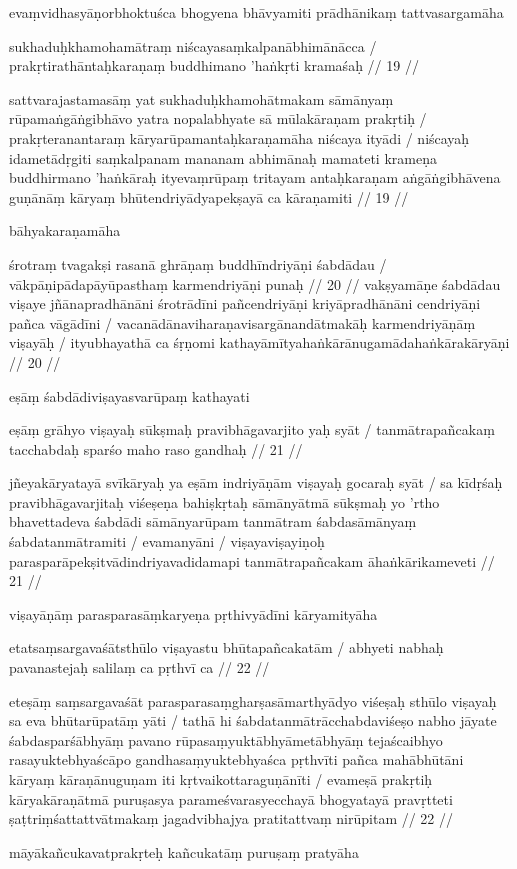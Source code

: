evaṃvidhasyāṇorbhoktuśca bhogyena bhāvyamiti prādhānikaṃ tattvasargamāha

sukhaduḥkhamohamātraṃ niścayasaṃkalpanābhimānācca  /
prakṛtirathāntaḥkaraṇaṃ buddhimano 'haṅkṛti kramaśaḥ  // 19  //

sattvarajastamasāṃ yat sukhaduḥkhamohātmakam sāmānyaṃ rūpamaṅgāṅgibhāvo yatra nopalabhyate sā mūlakāraṇam prakṛtiḥ  / prakṛteranantaraṃ kāryarūpamantaḥkaraṇamāha niścaya ityādi  / niścayaḥ idametādṛgiti saṃkalpanam mananam abhimānaḥ mamateti krameṇa buddhirmano 'haṅkāraḥ ityevaṃrūpaṃ tritayam antaḥkaraṇam aṅgāṅgibhāvena guṇānāṃ kāryaṃ bhūtendriyādyapekṣayā ca kāraṇamiti  // 19  //

bāhyakaraṇamāha

śrotraṃ tvagakṣi rasanā ghrāṇaṃ buddhīndriyāṇi śabdādau  /
vākpāṇipādapāyūpasthaṃ karmendriyāṇi punaḥ  // 20  //
vakṣyamāṇe śabdādau viṣaye jñānapradhānāni śrotrādīni pañcendriyāṇi kriyāpradhānāni cendriyāṇi pañca vāgādīni  / vacanādānaviharaṇavisargānandātmakāḥ karmendriyāṇāṃ viṣayāḥ  / ityubhayathā ca śṛṇomi kathayāmītyahaṅkārānugamādahaṅkārakāryāṇi  // 20  //

eṣāṃ śabdādiviṣayasvarūpaṃ kathayati

eṣāṃ grāhyo viṣayaḥ sūkṣmaḥ pravibhāgavarjito yaḥ syāt  /
tanmātrapañcakaṃ tacchabdaḥ sparśo maho raso gandhaḥ  // 21  //

jñeyakāryatayā svīkāryaḥ ya eṣām indriyāṇām viṣayaḥ gocaraḥ syāt  / sa kīdṛśaḥ pravibhāgavarjitaḥ viśeṣeṇa bahiṣkṛtaḥ sāmānyātmā sūkṣmaḥ yo 'rtho bhavettadeva śabdādi sāmānyarūpam tanmātram śabdasāmānyaṃ śabdatanmātramiti  / evamanyāni  / viṣayaviṣayiṇoḥ parasparāpekṣitvādindriyavadidamapi tanmātrapañcakam āhaṅkārikameveti  // 21  //

viṣayāṇāṃ parasparasāṃkaryeṇa pṛthivyādīni kāryamityāha

etatsaṃsargavaśātsthūlo viṣayastu bhūtapañcakatām  /
abhyeti nabhaḥ pavanastejaḥ salilaṃ ca pṛthvī ca  // 22  //

eteṣāṃ saṃsargavaśāt parasparasaṃgharṣasāmarthyādyo viśeṣaḥ sthūlo viṣayaḥ sa eva bhūtarūpatāṃ yāti  / tathā hi śabdatanmātrācchabdaviśeṣo nabho jāyate śabdasparśābhyāṃ pavano rūpasaṃyuktābhyāmetābhyāṃ tejaścaibhyo rasayuktebhyaścāpo gandhasaṃyuktebhyaśca pṛthvīti pañca mahābhūtāni kāryaṃ kāraṇānuguṇam iti kṛtvaikottaraguṇānīti  / evameṣā prakṛtiḥ kāryakāraṇātmā puruṣasya parameśvarasyecchayā bhogyatayā pravṛtteti ṣaṭtriṃśattattvātmakaṃ jagadvibhajya pratitattvaṃ nirūpitam  // 22  //

māyākañcukavatprakṛteḥ kañcukatāṃ puruṣaṃ pratyāha

